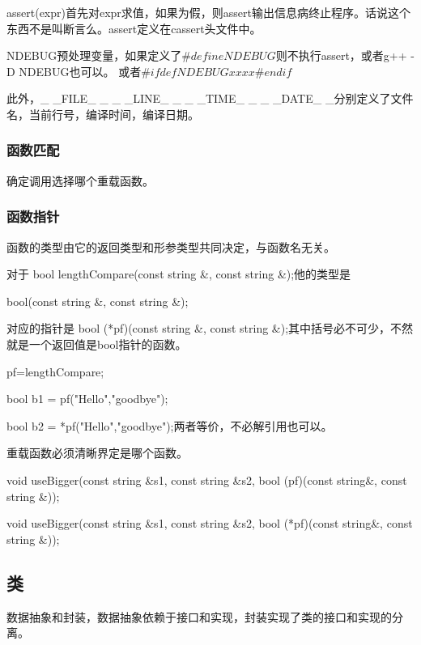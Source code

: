\begin{itemize}
	assert(expr)首先对expr求值，如果为假，则assert输出信息病终止程序。话说这个东西不是叫断言么。assert定义在cassert头文件中。
	
	NDEBUG预处理变量，如果定义了$\#define NDEBUG$则不执行assert，或者g++ -D NDEBUG也可以。
	或者$\#ifdef NDEBUG xxxx \#endif$
	
	此外，\_ \_FILE\_ \_ \_ \_LINE\_ \_ \_ \_TIME\_ \_ \_ \_DATE\_ \_分别定义了文件名，当前行号，编译时间，编译日期。
\end{itemize}

\subsubsection{函数匹配}
确定调用选择哪个重载函数。

\subsubsection{函数指针}
函数的类型由它的返回类型和形参类型共同决定，与函数名无关。

对于 bool lengthCompare(const string \&, const string \&);他的类型是

bool(const string \&, const string \&);

对应的指针是 bool (*pf)(const string \&, const string \&);其中括号必不可少，不然就是一个返回值是bool指针的函数。

pf=lengthCompare;

bool b1 = pf("Hello","goodbye");

bool b2 = *pf("Hello","goodbye");两者等价，不必解引用也可以。

重载函数必须清晰界定是哪个函数。

void useBigger(const string \&s1, const string \&s2, bool (pf)(const string\&, const string \&));

void useBigger(const string \&s1, const string \&s2, bool (*pf)(const string\&, const string \&));

\subsection{类}

数据抽象和封装，数据抽象依赖于接口和实现，封装实现了类的接口和实现的分离。

